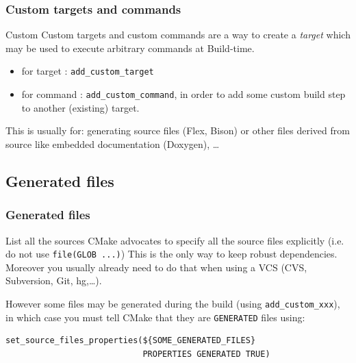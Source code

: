 \documentclass[compress,slidestop,table,usepdftitle=false
              ]
               {beamer}
\begin{document}
\begin{frame}[fragile]
\frametitle{Custom targets and commands}
\begin{block}{Custom}
Custom targets and custom commands are a way to create a \emph{target}
which may be used to execute arbitrary commands at \alert{Build-time}.
\vspace*{0.4cm}
\begin{itemize}
\item for target  : \lstinline!add_custom_target!
\item for command : \lstinline!add_custom_command!, in order to add some
custom build step to another (existing) target.
\end{itemize}
\end{block}
This is usually for: generating source files (Flex, Bison) or
other files derived from source like embedded documentation (Doxygen), \ldots
\end{frame}

\subsection{Generated files}
\begin{frame}[fragile]
\frametitle{Generated files}
\begin{block}{List all the sources}
CMake advocates to specify all the source files explicitly
(i.e. do not use \lstinline!file(GLOB ...)!)
This is the only way to keep robust dependencies.
Moreover you usually already need to do that when using a VCS
(CVS, Subversion, Git, hg,\ldots).
\end{block}
However some files may be generated during the build (using \lstinline!add_custom_xxx!),
in which case you must tell CMake that they are \lstinline!GENERATED! files
using:

\begin{lstlisting}[basicstyle=\scriptsize]
set_source_files_properties(${SOME_GENERATED_FILES}
                            PROPERTIES GENERATED TRUE)
\end{lstlisting}
\end{frame}

\end{document}
